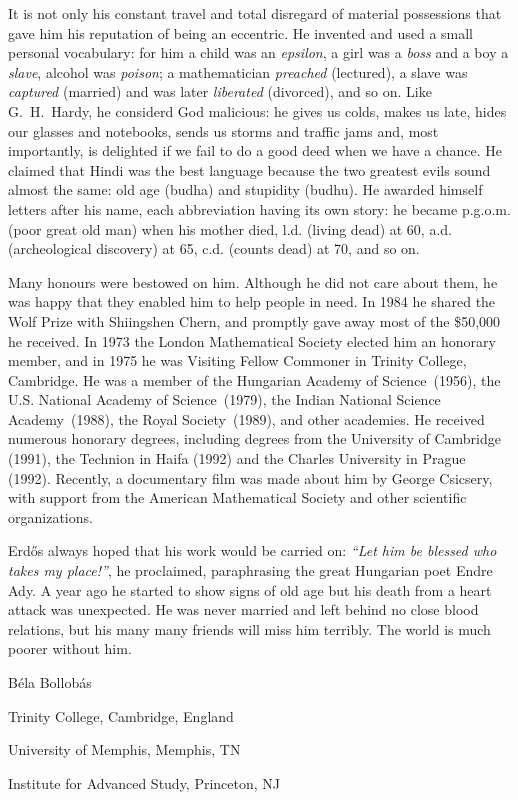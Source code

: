 It is not only his constant travel and total disregard of material possessions
that gave him his reputation of being an eccentric.
He invented
and used a small personal vocabulary: for him a child was an {\it epsilon}, 
a girl was a {\it boss} and a 
boy a {\it slave}, alcohol was {\it poison}; a mathematician {\it preached} 
(lectured), a slave was {\it captured} (married) and was
later {\it liberated} (divorced), and so on.
Like G.~H.~Hardy, he considerd God 
malicious: he gives us colds, makes us late, hides our glasses and notebooks, 
sends us storms and traffic jams and,
most importantly, is delighted if we fail to do a good deed 
when we have a chance. He claimed 
that Hindi was the best language because the two greatest evils sound 
almost the same: old age (budha) and stupidity (budhu). 
He awarded himself letters after his name, each abbreviation 
having its own story: he became p.g.o.m. (poor
great old man) when his mother died, l.d. (living dead) at 60, a.d. 
(archeological discovery) at 65, c.d. (counts dead) at 70, and so on.

Many honours were bestowed on him. Although he did not care about them, he was
happy that they enabled him to help people in need. 
In 1984 he shared the Wolf Prize with Shiingshen Chern, and promptly gave
away most of the \$50,000 he received.
In 1973 the London Mathematical Society elected him an honorary member,
and in 1975 he was Visiting Fellow Commoner in Trinity College, Cambridge.
He was a member of the Hungarian Academy of Science~(1956), the U.S. National
Academy of Science~(1979), the Indian National Science Academy~(1988), the
Royal Society~(1989), and other academies. 
He received numerous honorary degrees, 
including degrees from the University of Cambridge (1991), the Technion
in Haifa (1992) and the Charles University in Prague (1992). Recently,
a documentary film was made about him by George Csicsery, 
with support from the American Mathematical Society and other scientific 
organizations.

Erd\H{o}s always hoped that his work would be carried on: 
{\it ``Let him be blessed
who takes my place!''}, he proclaimed, paraphrasing the great Hungarian poet 
Endre Ady.
A year ago he started to show signs of old age but his death from a 
heart attack was unexpected. He was never married and left behind no close 
blood relations, but his many many friends will miss him terribly.
The world is much poorer without him.

\vskip 2cm

\hskip 6cm 
B\'ela Bollob\'as

\medskip
\hskip 4cm
Trinity College, Cambridge, England 

\hskip 4cm
University of Memphis, Memphis, TN 

\hskip4cm
Institute for Advanced Study, Princeton, NJ

\bye


